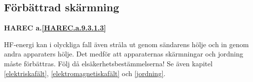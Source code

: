 \subsection{Förbättrad skärmning}
\textbf{
HAREC a.\ref{HAREC.a.9.3.1.3}\label{myHAREC.a.9.3.1.3}
}

HF-energi kan i olyckliga fall även stråla ut genom sändarens hölje
och in genom andra apparaters hölje. Det medför att apparaternas
skärmningar och jordning måste förbättras. Följ då
elsäkerhetsbestämmelserna!  Se även kapitel \ref{elektriskafält},
\ref{elektromagnetiskafält} och \ref{jordning}.
